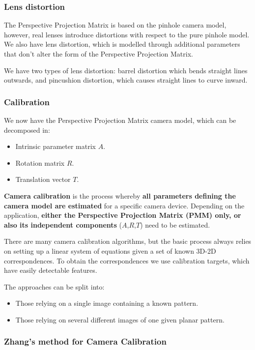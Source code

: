 \documentclass{article}
\begin{document}
\subsubsection{Lens distortion}

The Perspective Projection Matrix is based on the pinhole camera model, however, real lenses introduce distortions with respect to the pure pinhole model.
We also have lens distortion, which is modelled through additional parameters that don't alter the form of the Perspective Projection Matrix.

We have two types of lens distortion: barrel distortion which bends straight lines outwards, and pincushion distortion, which causes straight lines to curve inward.

\subsubsection{Calibration}

We now have the Perspective Projection Matrix camera model, which can be decomposed in:
\begin{itemize}
  \item Intrinsic parameter matrix $A$.
  \item Rotation matrix $R$.
  \item Translation vector $T$.
\end{itemize}

\textbf{Camera calibration} is the process whereby \textbf{all parameters defining the camera model are estimated} for a specific camera device.
Depending on the application, \textbf{either the Perspective Projection Matrix (PMM) only, or also its independent components} ($A$,$R$,$T$) need to be estimated.

There are many camera calibration algorithms, but the basic process always relies on setting up a linear system of equations given a set of known 3D-2D correspondences.
To obtain the correspondences we use calibration targets, which have easily detectable features.

The approaches can be split into:
\begin{itemize}
  \item Those relying on a single image containing a known pattern.
  \item Those relying on several different images of one given planar pattern.
\end{itemize}

\subsubsection{Zhang's method for Camera Calibration}
\end{document}
